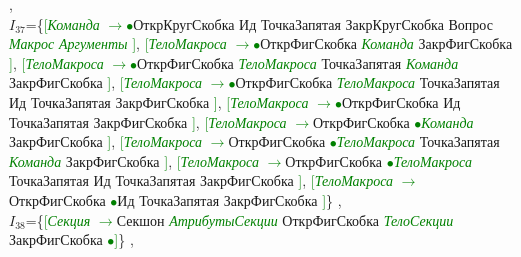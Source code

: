 \documentclass[a0]{a0poster}
\begin{document}
,\\
$I_{37}$=\{\textcolor{Green}{[}\textcolor{Green}{\textit{Команда}} \textcolor{Green}{$\to$}\textcolor{Green}{$\bullet$}ОткрКругСкобка Ид ТочкаЗапятая ЗакрКругСкобка Вопрос \textcolor{Green}{\textit{Макрос}} \textcolor{Green}{\textit{Аргументы}} \textcolor{Green}{]}, \textcolor{Green}{[}\textcolor{Green}{\textit{ТелоМакроса}} \textcolor{Green}{$\to$}\textcolor{Green}{$\bullet$}ОткрФигСкобка \textcolor{Green}{\textit{Команда}} ЗакрФигСкобка \textcolor{Green}{]}, \textcolor{Green}{[}\textcolor{Green}{\textit{ТелоМакроса}} \textcolor{Green}{$\to$}\textcolor{Green}{$\bullet$}ОткрФигСкобка \textcolor{Green}{\textit{ТелоМакроса}} ТочкаЗапятая \textcolor{Green}{\textit{Команда}} ЗакрФигСкобка \textcolor{Green}{]}, \textcolor{Green}{[}\textcolor{Green}{\textit{ТелоМакроса}} \textcolor{Green}{$\to$}\textcolor{Green}{$\bullet$}ОткрФигСкобка \textcolor{Green}{\textit{ТелоМакроса}} ТочкаЗапятая Ид ТочкаЗапятая ЗакрФигСкобка \textcolor{Green}{]}, \textcolor{Green}{[}\textcolor{Green}{\textit{ТелоМакроса}} \textcolor{Green}{$\to$}\textcolor{Green}{$\bullet$}ОткрФигСкобка Ид ТочкаЗапятая ЗакрФигСкобка \textcolor{Green}{]}, \textcolor{Green}{[}\textcolor{Green}{\textit{ТелоМакроса}} \textcolor{Green}{$\to$}ОткрФигСкобка \textcolor{Green}{$\bullet$}\textcolor{Green}{\textit{Команда}} ЗакрФигСкобка \textcolor{Green}{]}, \textcolor{Green}{[}\textcolor{Green}{\textit{ТелоМакроса}} \textcolor{Green}{$\to$}ОткрФигСкобка \textcolor{Green}{$\bullet$}\textcolor{Green}{\textit{ТелоМакроса}} ТочкаЗапятая \textcolor{Green}{\textit{Команда}} ЗакрФигСкобка \textcolor{Green}{]}, \textcolor{Green}{[}\textcolor{Green}{\textit{ТелоМакроса}} \textcolor{Green}{$\to$}ОткрФигСкобка \textcolor{Green}{$\bullet$}\textcolor{Green}{\textit{ТелоМакроса}} ТочкаЗапятая Ид ТочкаЗапятая ЗакрФигСкобка \textcolor{Green}{]}, \textcolor{Green}{[}\textcolor{Green}{\textit{ТелоМакроса}} \textcolor{Green}{$\to$}ОткрФигСкобка \textcolor{Green}{$\bullet$}Ид ТочкаЗапятая ЗакрФигСкобка \textcolor{Green}{]}\}
,\\
$I_{38}$=\{\textcolor{Green}{[}\textcolor{Green}{\textit{Секция}} \textcolor{Green}{$\to$}Секшон \textcolor{Green}{\textit{АтрибутыСекции}} ОткрФигСкобка \textcolor{Green}{\textit{ТелоСекции}} ЗакрФигСкобка \textcolor{Green}{$\bullet$}\textcolor{Green}{]}\}
,\\
\end{document}

